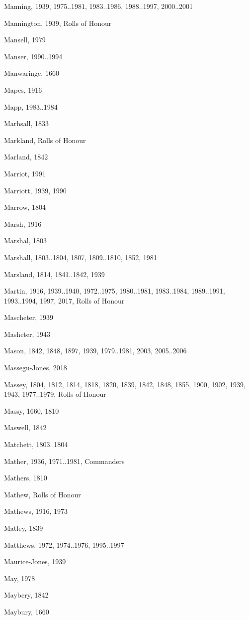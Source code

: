 \begin{theindex}
\item Manning, 1939, 1975..1981, 1983..1986, 1988..1997, 2000..2001
\item Mannington, 1939, Rolls of Honour
\item Mansell, 1979
\item Manser, 1990..1994
\item Manwaringe, 1660
\item Mapes, 1916
\item Mapp, 1983..1984
\item Marhsall, 1833
\item Markland, Rolls of Honour
\item Marland, 1842
\item Marriot, 1991
\item Marriott, 1939, 1990
\item Marrow, 1804
\item Marsh, 1916
\item Marshal, 1803
\item Marshall, 1803..1804, 1807, 1809..1810, 1852, 1981
\item Marsland, 1814, 1841..1842, 1939
\item Martin, 1916, 1939..1940, 1972..1975, 1980..1981, 1983..1984, 1989..1991, 1993..1994, 1997, 2017, Rolls of Honour
\item Mascheter, 1939
\item Masheter, 1943
\item Mason, 1842, 1848, 1897, 1939, 1979..1981, 2003, 2005..2006
\item Massegu-Jones, 2018
\item Massey, 1804, 1812, 1814, 1818, 1820, 1839, 1842, 1848, 1855, 1900, 1902, 1939, 1943, 1977..1979, Rolls of Honour
\item Massy, 1660, 1810
\item Maswell, 1842
\item Matchett, 1803..1804
\item Mather, 1936, 1971..1981, Commanders
\item Mathers, 1810
\item Mathew, Rolls of Honour
\item Mathews, 1916, 1973
\item Matley, 1839
\item Matthews, 1972, 1974..1976, 1995..1997
\item Maurice-Jones, 1939
\item May, 1978
\item Maybery, 1842
\item Maybury, 1660

\end{theindex}

